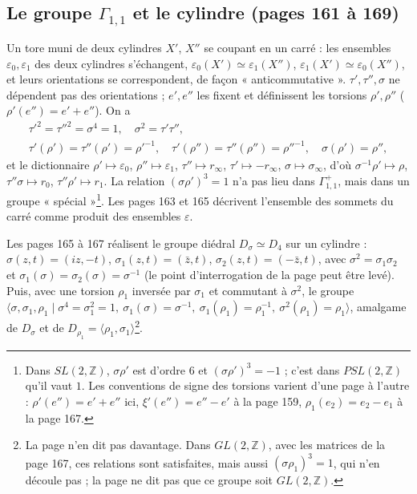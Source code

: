 \documentclass[11pt,a4paper]{article}
\begin{document}
\subsection*{Le groupe $\Gamma_{1,1}$ et le cylindre (pages 161 à 169)}

Un tore muni de deux cylindres $X'$, $X''$ se coupant en un carré : les
ensembles $\varepsilon_0, \varepsilon_1$ des deux cylindres s'échangent,
$\varepsilon_0(X') \simeq \varepsilon_1(X'')$, $\varepsilon_1(X') \simeq \varepsilon_0(X'')$,
et leurs orientations se correspondent, de façon « anticommutative ».
$\tau', \tau'', \sigma$ ne dépendent pas des orientations ; $e', e''$ les fixent
et définissent les torsions $\rho', \rho''$ ($\rho'(e'') = e' + e''$). On a
\[
\begin{gathered}
\tau'^2 = \tau''^2 = \sigma^4 = 1, \quad \sigma^2 = \tau'\tau'', \\
\tau'(\rho') = \tau''(\rho') = \rho'^{-1}, \quad \tau'(\rho'') = \tau''(\rho'') = \rho''^{-1}, \quad \sigma(\rho') = \rho'',
\end{gathered}
\]
et le dictionnaire $\rho' \mapsto \varepsilon_0$, $\rho'' \mapsto \varepsilon_1$,
$\tau'' \mapsto r_\infty$, $\tau' \mapsto -r_\infty$, $\sigma \mapsto \sigma_\infty$,
d'où $\sigma^{-1}\rho' \mapsto \rho$, $\tau''\sigma \mapsto r_0$,
$\tau''\rho' \mapsto r_1$. La relation $(\sigma\rho')^3 = 1$ n'a pas lieu dans
$\Gamma^{+}_{1,1}$, mais dans un groupe « spécial »\footnote{Dans
$SL(2, \mathbb{Z})$, $\sigma\rho'$ est d'ordre $6$ et $(\sigma\rho')^3 = -1$ ;
c'est dans $PSL(2, \mathbb{Z})$ qu'il vaut $1$. Les conventions de signe des
torsions varient d'une page à l'autre : $\rho'(e'') = e' + e''$ ici,
$\xi'(e'') = e'' - e'$ à la page 159, $\rho_1(e_2) = e_2 - e_1$ à la page
167.}. Les pages 163 et 165 décrivent l'ensemble des sommets du carré
comme produit des ensembles $\varepsilon$.

Les pages 165 à 167 réalisent le groupe diédral $D_\sigma \simeq D_4$ sur un
cylindre : $\sigma(z, t) = (iz, -t)$, $\sigma_1(z, t) = (\bar z, t)$,
$\sigma_2(z, t) = (-\bar z, t)$, avec $\sigma^2 = \sigma_1\sigma_2$ et
$\sigma_1(\sigma) = \sigma_2(\sigma) = \sigma^{-1}$ (le point d'interrogation de
la page peut être levé). Puis, avec une torsion $\rho_1$ inversée par
$\sigma_1$ et commutant à $\sigma^2$, le groupe
$\langle \sigma, \sigma_1, \rho_1 \mid \sigma^4 = \sigma_1^2 = 1,\ \sigma_1(\sigma) = \sigma^{-1},\ \sigma_1(\rho_1) = \rho_1^{-1},\ \sigma^2(\rho_1) = \rho_1 \rangle$,
amalgame de $D_\sigma$ et de $D_{\rho_1} = \langle \rho_1, \sigma_1 \rangle$\footnote{La
page n'en dit pas davantage. Dans $GL(2, \mathbb{Z})$, avec les matrices de la
page 167, ces relations sont satisfaites, mais aussi $(\sigma\rho_1)^3 = 1$, qui
n'en découle pas ; la page ne dit pas que ce groupe soit $GL(2, \mathbb{Z})$.}.
\end{document}
